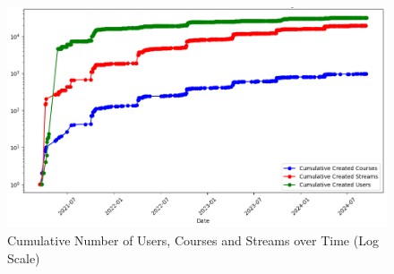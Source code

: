 \begin{figure}[htpb]
    \centering
    \includegraphics[width=\linewidth]{images/TUMLiveStats2.png}
    \caption[Cumulative Number of Users, Courses and Streams over Time (Log Scale)]{Cumulative Number of Users, Courses and Streams over Time (Log Scale)}\label{fig:tumlive-stats-2}
\end{figure}
